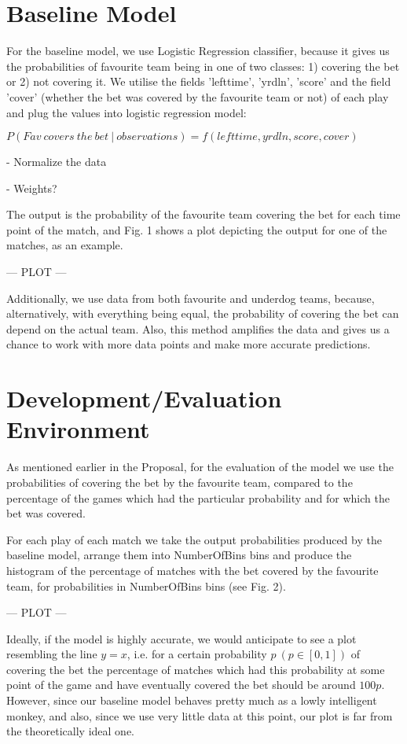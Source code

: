 \documentclass[runningheads]{llncs}
\begin{document}
\section{Baseline Model}

For the baseline model, we use Logistic Regression classifier, because it gives us the probabilities of favourite team being in one of two classes: 1) covering the bet or 2) not covering it. We utilise the fields 'lefttime', 'yrdln', 'score' and the field 'cover' (whether the bet was covered by the favourite team or not) of each play and plug the values into logistic regression model:

$P(Fav \ covers \ the \ bet  \ | \ observations) = f(lefttime, yrdln, score, cover)$


- Normalize the data

- Weights?

The output is the probability of the favourite team covering the bet for each time point of the match, and Fig. 1 shows a plot depicting the output for one of the matches, as an example.


--- PLOT ---


Additionally, we use data from both favourite and underdog teams, because, alternatively, with everything being equal, the probability of covering the bet can depend on the actual team. Also, this method amplifies the data and gives us a chance to work with more data points and make more accurate predictions. 


\section{Development/Evaluation Environment}

As mentioned earlier in the Proposal, for the evaluation of the model we use the probabilities of covering the bet by the favourite team, compared to the percentage of the games which had the particular probability and for which the bet was covered.

For each play of each match we take the output probabilities produced by the baseline model, arrange them into NumberOfBins bins and produce the histogram of the percentage of matches with the bet covered by the favourite team, for probabilities in NumberOfBins bins (see Fig. 2).


--- PLOT ---


Ideally, if the model is highly accurate, we would anticipate to see a plot resembling the line $y = x$, i.e. for a certain probability $p \ (p \in [0,1])$ of covering the bet the percentage of matches which had this probability at some point of the game and have eventually covered the bet should be around $100p$. However, since our baseline model behaves pretty much as a lowly intelligent monkey, and also, since we use very little data at this point, our plot is far from the theoretically ideal one. 
\end{document}

